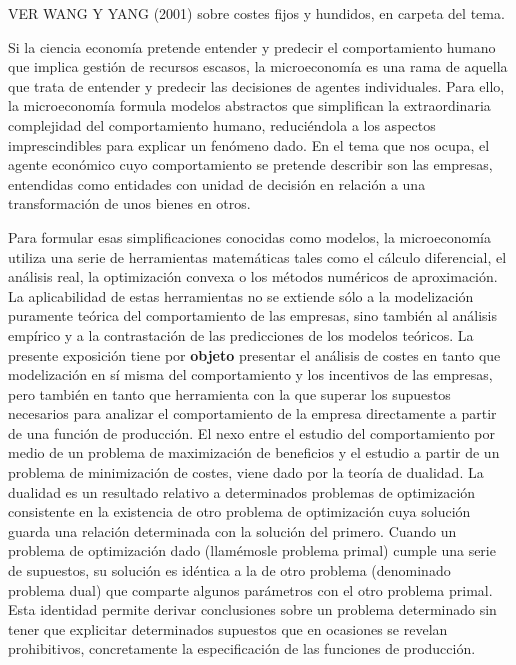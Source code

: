 \documentclass{nuevotema}
\begin{document}
\ideaclave

VER WANG Y YANG (2001) sobre costes fijos y hundidos, en carpeta del tema.


Si la ciencia economía pretende entender y predecir el comportamiento humano que implica gestión de recursos escasos, la microeconomía es una rama de aquella que trata de entender y predecir las decisiones de agentes individuales. Para ello, la microeconomía formula modelos abstractos que simplifican la extraordinaria complejidad del comportamiento humano, reduciéndola a los aspectos imprescindibles para explicar un fenómeno dado. En el tema que nos ocupa, el agente económico cuyo comportamiento se pretende describir son las empresas, entendidas como entidades con unidad de decisión en relación a una transformación de unos bienes en otros. 

Para formular esas simplificaciones conocidas como modelos, la microeconomía utiliza una serie de herramientas matemáticas tales como el cálculo diferencial, el análisis real, la optimización convexa o los métodos numéricos de aproximación. La aplicabilidad de estas herramientas no se extiende sólo a la modelización puramente teórica del comportamiento de las empresas, sino también al análisis empírico y a la contrastación de las predicciones de los modelos teóricos. La presente exposición tiene por \textbf{objeto} presentar el análisis de costes en tanto que modelización en sí misma del comportamiento y los incentivos de las empresas, pero también en tanto que herramienta con la que superar los supuestos necesarios para analizar el comportamiento de la empresa directamente a partir de una función de producción. El nexo entre el estudio del comportamiento por medio de un problema de maximización de beneficios y el estudio a partir de un problema de minimización de costes, viene dado por la teoría de dualidad. La dualidad es un resultado relativo a determinados problemas de optimización consistente en la existencia de otro problema de optimización cuya solución guarda una relación determinada con la solución del primero. Cuando un problema de optimización dado (llamémosle problema primal) cumple una serie de supuestos, su solución es idéntica a la de otro problema (denominado problema dual) que comparte algunos parámetros con el otro problema primal. Esta identidad permite derivar conclusiones sobre un problema determinado sin tener que explicitar determinados supuestos que en ocasiones se revelan prohibitivos, concretamente la especificación de las funciones de producción.
\end{document}
